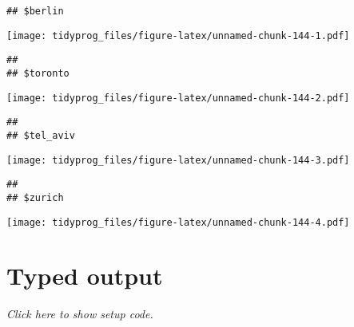 \documentclass[]{book}
\newenvironment{Shaded}{\begin{snugshade}}{\end{snugshade}}
\newcommand{\ControlFlowTok}[1]{\textcolor[rgb]{0.13,0.29,0.53}{\textbf{#1}}}
\newcommand{\KeywordTok}[1]{\textcolor[rgb]{0.13,0.29,0.53}{\textbf{#1}}}
\newcommand{\NormalTok}[1]{#1}
\newcommand{\OperatorTok}[1]{\textcolor[rgb]{0.81,0.36,0.00}{\textbf{#1}}}
\newcommand{\StringTok}[1]{\textcolor[rgb]{0.31,0.60,0.02}{#1}}
\begin{document}
\begin{enumerate}
\begin{Shaded}
\end{Shaded}

\begin{verbatim}
## $berlin
\end{verbatim}

  \texttt{[image: tidyprog\_files/figure-latex/unnamed-chunk-144-1.pdf]}

\begin{verbatim}
## 
## $toronto
\end{verbatim}

  \texttt{[image: tidyprog\_files/figure-latex/unnamed-chunk-144-2.pdf]}

\begin{verbatim}
## 
## $tel_aviv
\end{verbatim}

  \texttt{[image: tidyprog\_files/figure-latex/unnamed-chunk-144-3.pdf]}

\begin{verbatim}
## 
## $zurich
\end{verbatim}

  \texttt{[image: tidyprog\_files/figure-latex/unnamed-chunk-144-4.pdf]}
\end{enumerate}

\hypertarget{typed-output}{%
\section{Typed output}\label{typed-output}}

\emph{Click here to show setup code.}

\begin{Shaded}
\end{Shaded}
\end{document}
